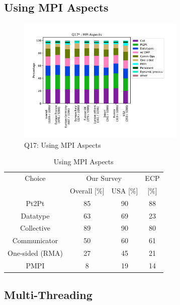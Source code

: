 \documentclass[conference,10pt,letterpaper]{IEEEtran}
\begin{document}
\subsection{Using MPI Aspects}

\begin{figure}[htb]
\begin{center}
\includegraphics[width=8cm]{Figs/Q17-enlarged.pdf}
\caption{Q17: Using MPI Aspects}
\label{fig:using-mpi-aspects}
\end{center}
\end{figure}

\begin{table}[htb]%
\begin{center}%
\caption{Using MPI Aspects}\label{tab:using-mpi-aspects}%
\begin{tabular}{c||c|c||c}%
\hline%
Choice & \multicolumn{2}{c||}{Our Survey} & ECP \\
\cline{2-4}%
& Overall [\%] & USA [\%] & [\%] \\
\hline%
\hline%
Pt2Pt & 85 & 90 & 88 \\
Datatype & 63 & 69 & 23 \\
Collective & 89 & 90 & 80 \\
Communicator & 50 & 60 & 61 \\
One-sided (RMA) & 27 & 45 & 21 \\
PMPI & 8 & 19 & 14 \\
\hline%
\end{tabular}%
\end{center}%
\end{table}%

\subsection{Multi-Threading}
\end{document}
